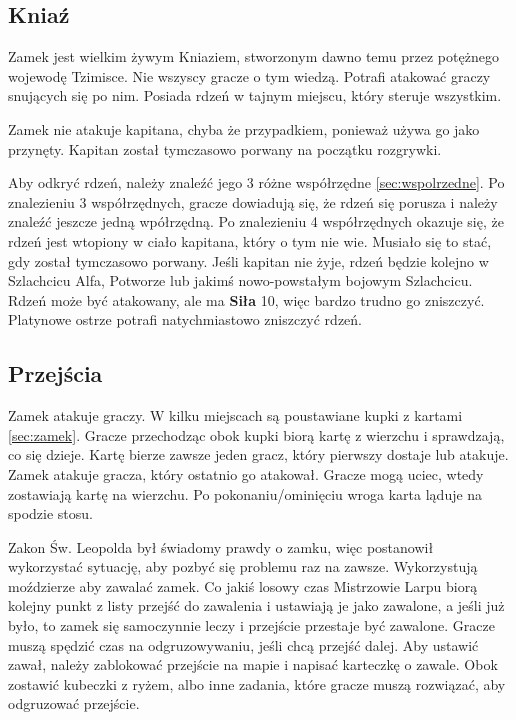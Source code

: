 	\subsection{Kniaź}
		Zamek jest wielkim żywym Kniaziem, stworzonym dawno temu przez potężnego wojewodę Tzimisce.
		Nie wszyscy gracze o tym wiedzą.
		Potrafi atakować graczy snujących się po nim.
		Posiada rdzeń w tajnym miejscu, który steruje wszystkim.
		
		Zamek nie atakuje kapitana, chyba że przypadkiem, ponieważ używa go jako przynęty.
		Kapitan został tymczasowo porwany na początku rozgrywki.
		
		Aby odkryć rdzeń, należy znaleźć jego 3 różne współrzędne \ref{sec:wspolrzedne}.
		Po znalezieniu 3 współrzędnych, gracze dowiadują się, że rdzeń się porusza i należy znaleźć jeszcze jedną wpółrzędną.
		Po znalezieniu 4 współrzędnych okazuje się, że rdzeń jest wtopiony w ciało kapitana, który o tym nie wie.
		Musiało się to stać, gdy został tymczasowo porwany.
		Jeśli kapitan nie żyje, rdzeń będzie kolejno w Szlachcicu Alfa, Potworze lub jakimś nowo-powstałym bojowym Szlachcicu.
		Rdzeń może być atakowany, ale ma \textbf{Siła} 10, więc bardzo trudno go zniszczyć.
		Platynowe ostrze potrafi natychmiastowo zniszczyć rdzeń.
		
	\subsection{Przejścia}
		Zamek atakuje graczy.
		W kilku miejscach są poustawiane kupki z kartami \ref{sec:zamek}.
		Gracze przechodząc obok kupki biorą kartę z wierzchu i sprawdzają, co się dzieje.
		Kartę bierze zawsze jeden gracz, który pierwszy dostaje lub atakuje.
		Zamek atakuje gracza, który ostatnio go atakował.
		Gracze mogą uciec, wtedy zostawiają kartę na wierzchu.
		Po pokonaniu/ominięciu wroga karta ląduje na spodzie stosu.
		
		Zakon Św. Leopolda był świadomy prawdy o zamku, więc postanowił wykorzystać sytuację, aby pozbyć się problemu raz na zawsze.
		Wykorzystują moździerze aby zawalać zamek.
		Co jakiś losowy czas Mistrzowie Larpu biorą kolejny punkt z listy przejść do zawalenia i ustawiają je jako zawalone, a jeśli już było, to zamek się samoczynnie leczy i przejście przestaje być zawalone.
		Gracze muszą spędzić czas na odgruzowywaniu, jeśli chcą przejść dalej.
		Aby ustawić zawał, należy zablokować przejście na mapie i napisać karteczkę o zawale.
		Obok zostawić kubeczki z ryżem, albo inne zadania, które gracze muszą rozwiązać, aby odgruzować przejście.
		
